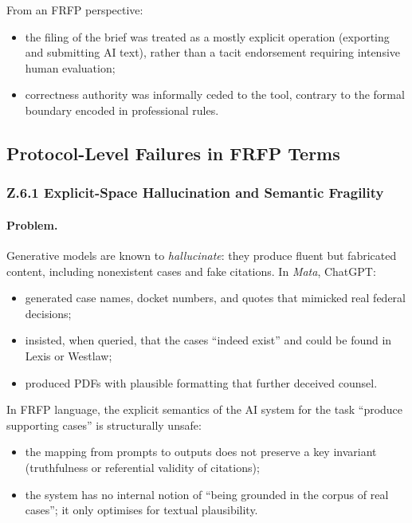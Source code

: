 From an FRFP perspective:

\begin{itemize}
  \item the filing of the brief was treated as a mostly explicit operation
        (exporting and submitting AI text), rather than a tacit endorsement
        requiring intensive human evaluation;
  \item correctness authority was informally ceded to the tool, contrary to
        the formal boundary encoded in professional rules.
\end{itemize}

\subsection{Protocol-Level Failures in FRFP Terms}

\subsubsection*{Z.6.1 Explicit-Space Hallucination and Semantic Fragility}

\paragraph{Problem.}
Generative models are known to \emph{hallucinate}:
they produce fluent but fabricated content, including nonexistent cases and
fake citations.
In \emph{Mata}, ChatGPT:

\begin{itemize}
  \item generated case names, docket numbers, and quotes that mimicked real
        federal decisions;
  \item insisted, when queried, that the cases ``indeed exist'' and could be
        found in Lexis or Westlaw;
  \item produced PDFs with plausible formatting that further deceived counsel.
\end{itemize}

In FRFP language, the explicit semantics of the AI system for the task
``produce supporting cases'' is structurally unsafe:

\begin{itemize}
  \item the mapping from prompts to outputs does not preserve a key invariant
        (truthfulness or referential validity of citations);
  \item the system has no internal notion of ``being grounded in the corpus
        of real cases''; it only optimises for textual plausibility.
\end{itemize}

